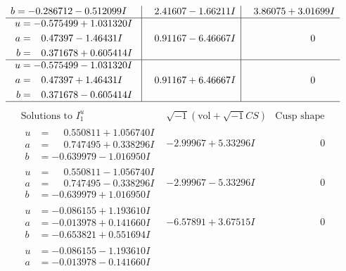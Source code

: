 \documentclass[1p]{elsarticle_modified}
\theoremstyle{definition}
\newcommand{\I}{\sqrt{-1}}
\begin{document}
$$\begin{array}{c|c|c}
\begin{aligned}
b &= -0.286712 - 0.512099 I\end{aligned}
 & \phantom{-}2.41607 - 1.66211 I & \phantom{-}3.86075 + 3.01699 I \\ \hline\begin{aligned}
u &= -0.575499 + 1.031320 I \\
a &= \phantom{-}0.47397 - 1.46431 I \\
b &= \phantom{-}0.371678 + 0.605414 I\end{aligned}
 & \phantom{-}0.91167 - 6.46667 I & \phantom{-0.000000 } 0 \\ \hline\begin{aligned}
u &= -0.575499 - 1.031320 I \\
a &= \phantom{-}0.47397 + 1.46431 I \\
b &= \phantom{-}0.371678 - 0.605414 I\end{aligned}
 & \phantom{-}0.91167 + 6.46667 I & \phantom{-0.000000 } 0\\
 \hline 
 \end{array}$$\newpage$$\begin{array}{c|c|c}  
\text{Solutions to }I^u_{1}& \I (\text{vol} + \sqrt{-1}CS) & \text{Cusp shape}\\
 \hline 
\begin{aligned}
u &= \phantom{-}0.550811 + 1.056740 I \\
a &= \phantom{-}0.747495 + 0.338296 I \\
b &= -0.639979 - 1.016950 I\end{aligned}
 & -2.99967 + 5.33296 I & \phantom{-0.000000 } 0 \\ \hline\begin{aligned}
u &= \phantom{-}0.550811 - 1.056740 I \\
a &= \phantom{-}0.747495 - 0.338296 I \\
b &= -0.639979 + 1.016950 I\end{aligned}
 & -2.99967 - 5.33296 I & \phantom{-0.000000 } 0 \\ \hline\begin{aligned}
u &= -0.086155 + 1.193610 I \\
a &= -0.013978 + 0.141660 I \\
b &= -0.653821 + 0.551694 I\end{aligned}
 & -6.57891 + 3.67515 I & \phantom{-0.000000 } 0 \\ \hline\begin{aligned}
u &= -0.086155 - 1.193610 I \\
a &= -0.013978 - 0.141660 I \\

\end{aligned}
\end{array}$$
\end{document}
